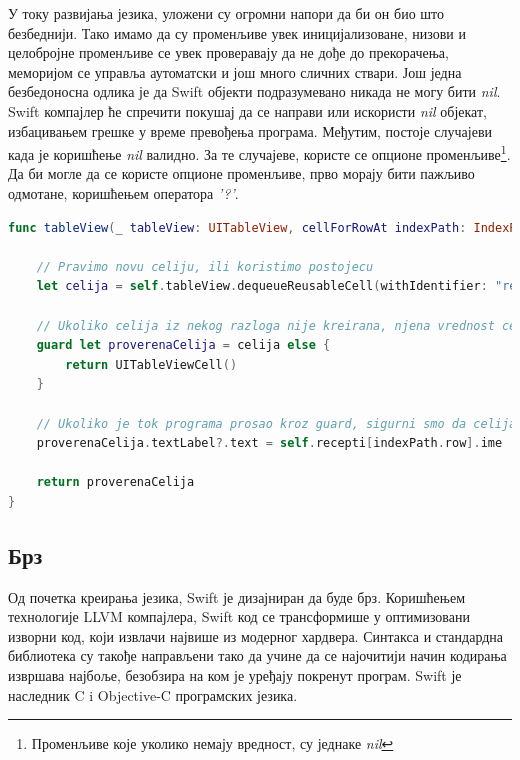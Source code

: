 \documentclass[12pt,oneside]{memoir}
\begin{document}
\indent У току развијања језика, уложени су огромни напори да би он био што безбеднији. Тако имамо да су променљиве увек иницијализоване, низови и целобројне променљиве се увек проверавају да не дође до прекорачења, меморијом се управља аутоматски и још много сличних ствари.
Још једна безбедоносна одлика је да Swift објекти подразумевано никада не могу бити \textit{nil}. Swift компајлер ће спречити покушај да се направи или искористи \textit{nil} објекат, избацивањем грешке у време превођења програма.
Међутим, постоје случајеви када је коришћење \textit{nil} валидно. За те случајеве, користе се опционе променљиве\footnote{Променљиве које уколико немају вредност, су једнаке \textit{nil}}. Да би могле да се користе опционе променљиве, прво морају бити пажљиво одмотане, коришћењем оператора \textit{'?'}.

\newpage %

\begin{lstlisting}[caption=\textit{{Коришћење опционе променљиве}}, label={lst:Опциона променљива}, language=Swift, frame=single]
func tableView(_ tableView: UITableView, cellForRowAt indexPath: IndexPath) -> UITableViewCell {
        
    // Pravimo novu celiju, ili koristimo postojecu
    let celija = self.tableView.dequeueReusableCell(withIdentifier: "receptCelija") as UITableViewCell
    
    // Ukoliko celija iz nekog razloga nije kreirana, njena vrednost ce biti 'nil', i nema potrebe da je dalje menjamo
    guard let proverenaCelija = celija else {
        return UITableViewCell()
    }
    
    // Ukoliko je tok programa prosao kroz guard, sigurni smo da celija nije 'nil' i mozemo je 'odmotati na silu' (eng. force unwrap)
    proverenaCelija.textLabel?.text = self.recepti[indexPath.row].ime
    
    return proverenaCelija
}

\end{lstlisting}

\subsection{Брз}

\indent Од почетка креирања језика, Swift је дизајниран да буде брз. Коришћењем технологије LLVM компајлера, Swift код се трансформише у оптимизовани изворни код, који извлачи највише из модерног хардвера. Синтакса и стандардна библиотека су такође направљени тако да учине да се најочитији начин кодирања извршава најбоље, безобзира на ком је уређају покренут програм.
Swift је наследник C i Objective-C програмских језика.
\end{document}
